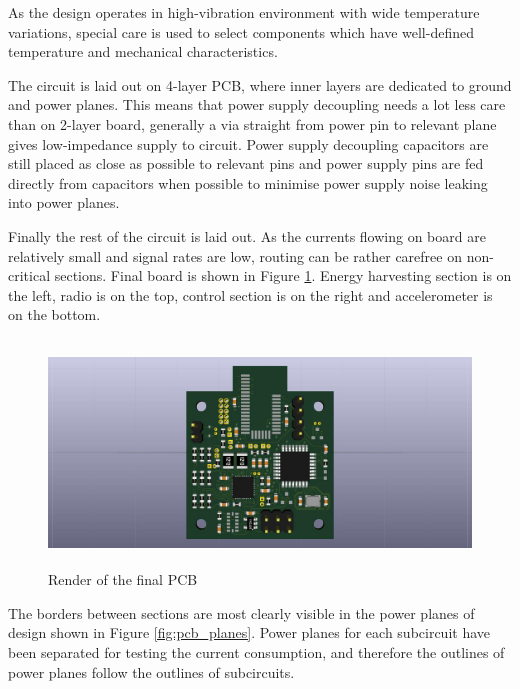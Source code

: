 As the design operates in high-vibration environment with wide temperature variations, special care is used to select components which have well-defined temperature and mechanical characteristics.

The circuit is laid out on 4-layer PCB, where inner layers are dedicated to ground and power planes. This means that power supply decoupling needs a lot less care than on 2-layer board, generally a via straight from power pin to relevant plane gives low-impedance supply to circuit. Power supply decoupling capacitors are still placed as close as possible to relevant pins and power supply pins are fed directly from capacitors when possible to minimise power supply noise leaking into power planes.

Finally the rest of the circuit is laid out. As the currents flowing on board are relatively small and signal rates are low, routing can be rather carefree on non-critical sections. Final board is shown in Figure \ref{fig:pcb_render}. Energy harvesting section is on the left, radio is on the top, control section is on the right and accelerometer is on the  bottom. 

\begin{figure}[htb]
  \begin{center}
    \includegraphics[height=6cm]{images/own_dwg/circuit/render.jpg}
  \end{center}
  \caption{\label{fig:pcb_render} Render of the final PCB}
\end{figure}

The borders between sections are most clearly visible in the power planes of design shown in Figure \ref{fig:pcb_planes}. Power planes for each subcircuit have been separated for testing the current consumption, and therefore the outlines of power planes follow the outlines of subcircuits.

